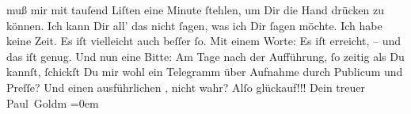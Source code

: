 \begin{ledgroupsized}[t]{13cm}
               muß mir mit tauſend Liſten eine Minute ſtehlen, um Dir die Hand drücken zu können.
                  {\pb}Ich kann Dir all’ das nicht ſagen, was ich Dir
               ſagen möchte. Ich habe keine Zeit. Es iſt vielleicht auch beſſer ſo. Mit einem Worte:
               Es iſt erreicht, – und das iſt genug. Und \strikeout{\textcolor{gray}{×}\-\textcolor{gray}{×}\-\textcolor{gray}{×}{ }\textcolor{gray}{×}\-\textcolor{gray}{×}\-\textcolor{gray}{×}\-\textcolor{gray}{×}\-\textcolor{gray}{×}} nun eine Bitte: Am Tage nach der Aufführung, ſo zeitig als Du
               kannſt, ſchickſt Du mir wohl ein Telegramm über Aufnahme durch Publicum und Preſſe?
               Und einen ausführlichen {\pb}\label{K_L02720-3v}\label{K_L02720-3h}, nicht wahr?\pend
           \pstart
           Alſo glückauf!!!\pend
           \pstart
           Dein treuer {\\[\baselineskip]}\spacefill\mbox{Paul Goldm}\pend
           \leftskip=0em{}
         
         \endnumbering{}\end{ledgroupsized}  \newcommand{\dateiname}{L02720}\newcommand{\titel}{Paul Goldmann an Arthur Schnitzler, 28. 11. [1893]}\newcommand{\editorInnen}{Martin Anton Müller und Laura Untner}
      